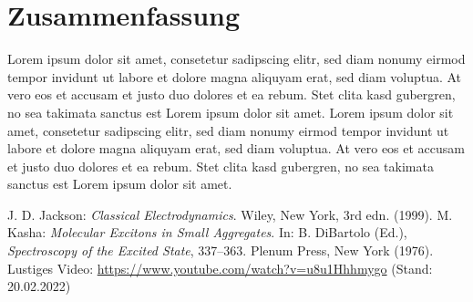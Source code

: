 \documentclass[a4paper,twoside,final]{article}
\begin{document}
\section{Zusammenfassung}
Lorem ipsum dolor sit amet, consetetur sadipscing elitr, sed diam nonumy eirmod tempor invidunt ut labore et dolore magna aliquyam erat, sed diam voluptua. At vero eos et accusam et justo duo dolores et ea rebum. Stet clita kasd gubergren, no sea takimata sanctus est Lorem ipsum dolor sit amet. Lorem ipsum dolor sit amet, consetetur sadipscing elitr, sed diam nonumy eirmod tempor invidunt ut labore et dolore magna aliquyam erat, sed diam voluptua. At vero eos et accusam et justo duo dolores et ea rebum. Stet clita kasd gubergren, no sea takimata sanctus est Lorem ipsum dolor sit amet.


\begin{thebibliography}{xxx}
	J. D. Jackson: \textit{Classical Electrodynamics}. Wiley, New York, 3rd edn. (1999).
	M. Kasha: \textit{Molecular Excitons in Small Aggregates}. In: B. DiBartolo (Ed.), \textit{Spectroscopy of the Excited State}, 337–363. Plenum Press, New York (1976).
	Lustiges Video: \url{https://www.youtube.com/watch?v=u8u1Hhhmygo} (Stand: 20.02.2022)
\end{thebibliography}
\end{document}
